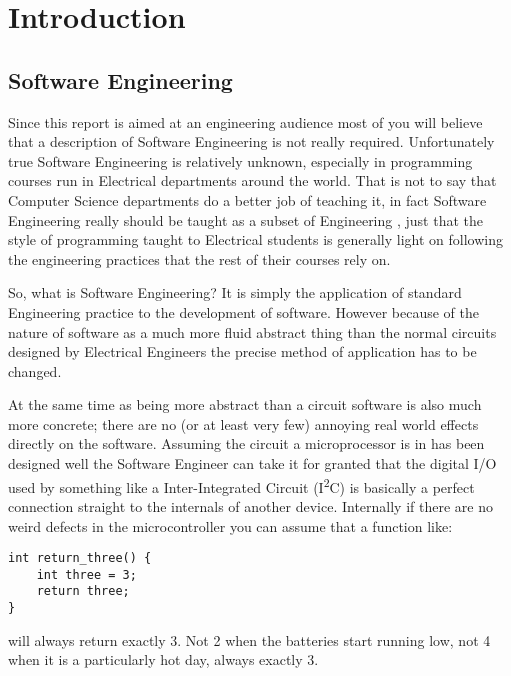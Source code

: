 \section{Introduction}

  \subsection{Software Engineering}

    Since this report is aimed at an engineering audience most of you will
    believe that a description of Software Engineering is not really required.
    Unfortunately true Software Engineering is relatively unknown, especially in
    programming courses run in Electrical departments around the world.  That is
    not to say that Computer Science departments do a better job of teaching it,
    in fact Software Engineering really should be taught as a subset of
    Engineering \cite{Parnas_1999}, just that the style of programming taught to
    Electrical students is generally light on following the engineering
    practices that the rest of their courses rely on.

    So, what is Software Engineering?  It is simply the application of standard
    Engineering practice to the development of software.  However because of the
    nature of software as a much more fluid abstract thing than the normal
    circuits designed by Electrical Engineers the precise method of application
    has to be changed.
    
    At the same time as being more abstract than a circuit software is also much
    more concrete; there are no (or at least very few) annoying real world
    effects directly on the software.  Assuming the circuit a microprocessor is
    in has been designed well the Software Engineer can take it for granted that
    the digital I/O used by something like a Inter-Integrated Circuit
    (I\textsuperscript{2}C) is basically a perfect connection straight to the
    internals of another device.  Internally if there are no weird defects in
    the microcontroller you can assume that a function like:

\begin{lstlisting}
int return_three() {
    int three = 3;
    return three;
}
\end{lstlisting}

    will always return exactly 3.  Not 2 when the batteries start running low,
    not 4 when it is a particularly hot day, always exactly 3.

